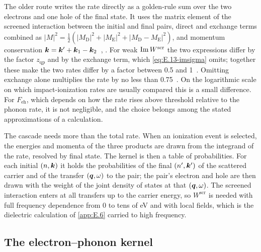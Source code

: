 The older route writes the rate directly as a golden-rule sum over the two electrons and one hole of the final state. It uses the matrix element of the screened interaction between the initial and final pairs, direct and exchange terms combined as $|M|^2 = \tfrac12(|M_{\mathrm{D}}|^2 + |M_{\mathrm{E}}|^2 + |M_{\mathrm{D}} - M_{\mathrm{E}}|^2)$, and momentum conservation $\bm{k} = \bm{k}' + \bm{k}_1 - \bm{k}_2$~\cite{kane1967electron}, \cite[Eq.~(5)]{kotani2010impact}. For weak $\operatorname{Im} W^{\mathrm{scr}}$ the two expressions differ by the factor $z_{\mathrm{qp}}$ and by the exchange term, which \cref{eq:E.13-imsigma} omits; together these make the two rates differ by a factor between 0.5 and 1~\cite[Sect.~II]{kotani2010impact}. Omitting exchange alone multiplies the rate by no less than 0.75~\cite[Sect.~II]{kotani2010impact}. On the logarithmic scale on which impact-ionization rates are usually compared this is a small difference. For $F_{\mathrm{eh}}$, which depends on how the rate rises above threshold relative to the phonon rate, it is not negligible, and the choice belongs among the stated approximations of a calculation.

The cascade needs more than the total rate. When an ionization event is selected, the energies and momenta of the three products are drawn from the integrand of the rate, resolved by final state. The kernel is then a table of probabilities. For each initial $(n, \bm{k})$ it holds the probabilities of the final $(n', \bm{k}')$ of the scattered carrier and of the transfer $(\bm{q}, \omega)$ to the pair; the pair's electron and hole are then drawn with the weight of the joint density of states at that $(\bm{q}, \omega)$. The screened interaction enters at all transfers up to the carrier energy, so $W^{\mathrm{scr}}$ is needed with full frequency dependence from 0 to tens of eV and with local fields, which is the dielectric calculation of \cref{app:E.6} carried to high frequency.

\subsection{The electron--phonon kernel}


